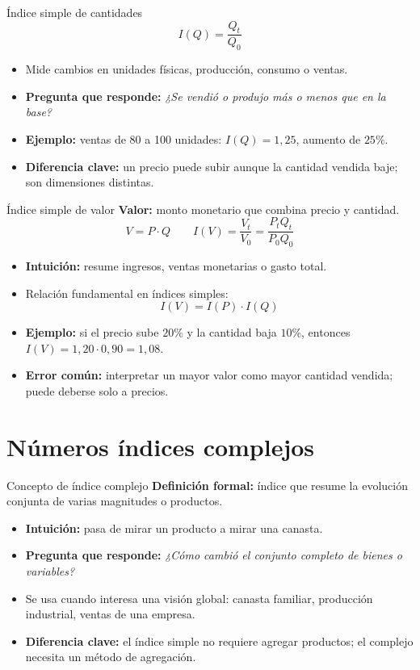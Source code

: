 \documentclass[aspectratio=169,11pt]{beamer}
\newcommand{\pregunta}[1]{\textbf{Pregunta que responde:} \emph{#1}}
\newcommand{\errorcomun}[1]{\textbf{Error común:} #1}
\newcommand{\diferencia}[1]{\textbf{Diferencia clave:} #1}
\newcommand{\intuicion}[1]{\textbf{Intuición:} #1}
\begin{document}
\begin{frame}{Índice simple de cantidades}
\[
I(Q)=\frac{Q_t}{Q_0}
\]
\begin{itemize}
  \item Mide cambios en unidades físicas, producción, consumo o ventas.
  \item \pregunta{¿Se vendió o produjo más o menos que en la base?}
  \item \textbf{Ejemplo:} ventas de 80 a 100 unidades: $I(Q)=1{,}25$, aumento de $25\%$.
  \item \diferencia{un precio puede subir aunque la cantidad vendida baje; son dimensiones distintas.}
\end{itemize}
\end{frame}

\begin{frame}{Índice simple de valor}
\textbf{Valor:} monto monetario que combina precio y cantidad.
\[
V=P\cdot Q \qquad I(V)=\frac{V_t}{V_0}=\frac{P_tQ_t}{P_0Q_0}
\]
\begin{itemize}
  \item \intuicion{resume ingresos, ventas monetarias o gasto total.}
  \item Relación fundamental en índices simples:
  \[
  I(V)=I(P)\cdot I(Q)
  \]
  \item \textbf{Ejemplo:} si el precio sube $20\%$ y la cantidad baja $10\%$, entonces $I(V)=1{,}20\cdot0{,}90=1{,}08$.
  \item \errorcomun{interpretar un mayor valor como mayor cantidad vendida; puede deberse solo a precios.}
\end{itemize}
\end{frame}

\section{Números índices complejos}

\begin{frame}{Concepto de índice complejo}
\textbf{Definición formal:} índice que resume la evolución conjunta de varias magnitudes o productos.
\begin{itemize}
  \item \intuicion{pasa de mirar un producto a mirar una canasta.}
  \item \pregunta{¿Cómo cambió el conjunto completo de bienes o variables?}
  \item Se usa cuando interesa una visión global: canasta familiar, producción industrial, ventas de una empresa.
  \item \diferencia{el índice simple no requiere agregar productos; el complejo necesita un método de agregación.}
\end{itemize}
\end{frame}
\end{document}
